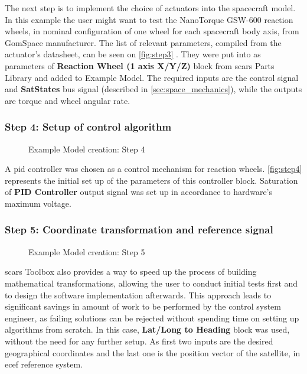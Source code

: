             The next step is to implement the choice of actuators into the spacecraft model. In this example the user might want to test the NanoTorque GSW-600 reaction wheels, in nominal configuration of one wheel for each spacecraft body axis, from GomSpace manufacturer. The list of relevant parameters, compiled from the actuator's datasheet, can be seen on \autoref{fig:step3} . They were put into as parameters of \textbf{Reaction Wheel (1 axis X/Y/Z)} block from \ac{scars} Parts Library and added to Example Model. The required inputs are the control signal and \textbf{SatStates} bus signal (described in \autoref{sec:space_mechanics}), while the outputs are torque and wheel angular rate.

        
        \subsubsection*{Step 4: Setup of control algorithm}
            \begin{figure}[H]
                \centering
                \qquad
                \caption{Example Model creation: Step 4}%
                \label{fig:step4}%
            \end{figure}
            A \ac{pid} controller was chosen as a control mechanism for reaction wheels. \autoref{fig:step4}  represents the initial set up of the parameters of this controller block. Saturation of \textbf{PID Controller} output signal was set up in accordance to hardware's maximum voltage.

        \subsubsection*{Step 5: Coordinate transformation and reference signal}
            \begin{figure}[H]
                \centering
                \caption{Example Model creation: Step 5}%
                \label{fig:step5}%
            \end{figure}
            \ac{scars} Toolbox also provides a way to speed up the process of building mathematical transformations, allowing the user to conduct initial tests first and to design the software implementation afterwards. This approach leads to significant savings in amount of work to be performed by the control system engineer, as failing solutions can be rejected without spending time on setting up algorithms from scratch. In this case, \textbf{Lat/Long to Heading} block was used, without the need for any further setup. As first two inputs are the desired geographical coordinates and the last one is the position vector of the satellite, in \ac{ecef} reference system.

